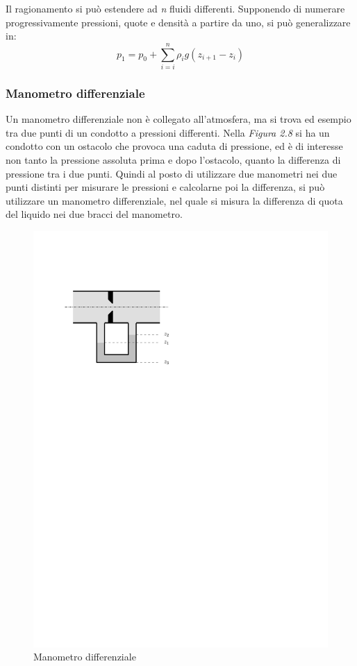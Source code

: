 Il ragionamento si può estendere ad \textit{n} fluidi differenti.
Supponendo di numerare progressivamente pressioni, quote e densità a partire da uno, si può generalizzare in:
	\begin{equation*}
		p_1 = p_0 + \sum_{i=i}^{n} \rho_i g (z_{i+1} - z_i)
	\end{equation*}
\subsubsection{Manometro differenziale}
Un manometro differenziale non è collegato all'atmosfera, ma si trova ed esempio tra due punti di un condotto a pressioni differenti.
Nella \textit{Figura 2.8} si ha un condotto con un ostacolo che provoca una caduta di pressione, ed è di interesse non tanto la pressione assoluta prima e dopo l'ostacolo, quanto la differenza di pressione tra i due punti.
Quindi al posto di utilizzare due manometri nei due punti distinti per misurare le pressioni e calcolarne poi la differenza, si può utilizzare un manometro differenziale, nel quale si misura la differenza di quota del liquido nei due bracci del manometro.
	\begin{figure}[ht]
		\includegraphics[scale=0.80]{./2.3 Manometri/2.3-6}
		\centering
		\caption{Manometro differenziale}
	\end{figure}
